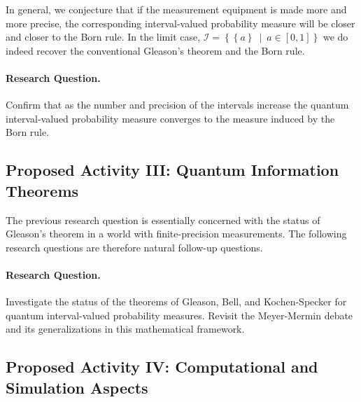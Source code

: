 \documentclass{article}
\theoremstyle{remark}
\begin{document}
In general, we conjecture that if the measurement equipment is made
more and more precise, the corresponding interval-valued probability
measure will be closer and closer to the Born rule. In the limit case,
$\mathscr{I}=\left\{ \left\{ a\right\}
  ~\middle|~a\in\left[0,1\right]\right\}$
we do indeed recover the conventional Gleason's theorem and the Born
rule.

\paragraph*{Research Question.} Confirm that as the number and
precision of the intervals increase the quantum interval-valued 
probability measure converges to the measure induced by the Born
rule. 

\subsection{Proposed Activity III: Quantum Information Theorems} 

The previous research question is essentially concerned with the
status of Gleason's theorem in a world with finite-precision
measurements. The following research questions are therefore natural
follow-up questions. 

\paragraph*{Research Question.} Investigate the status of the theorems
of Gleason, Bell, and Kochen-Specker for quantum interval-valued
probability measures. Revisit the Meyer-Mermin debate and its
generalizations in this mathematical framework.

\subsection{Proposed Activity IV: Computational and Simulation Aspects}
\end{document}
